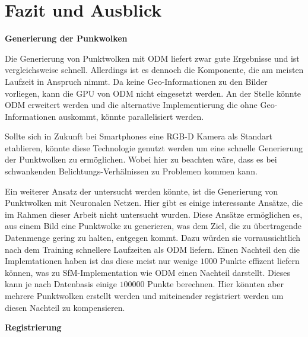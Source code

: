 \documentclass[12pt,titlepage, twoside]{article}
\begin{document}
\newpage
\section{Fazit und Ausblick}
\label{sec:fazit}
%

\textbf{Generierung der Punkwolken}

Die Generierung von Punktwolken mit ODM liefert zwar gute Ergebnisse und ist vergleichsweise schnell. Allerdings ist es dennoch die Komponente, die am meisten Laufzeit in Anspruch nimmt.
Da keine Geo-Informationen zu den Bilder vorliegen, kann die GPU von ODM nicht eingesetzt werden. 
An der Stelle könnte ODM erweitert werden und die alternative Implementierung die ohne Geo-Informationen auskommt, könnte parallelisiert werden.

Sollte sich in Zukunft bei Smartphones eine RGB-D Kamera als Standart etablieren, könnte diese Technologie genutzt werden um eine schnelle Generierung der Punktwolken zu ermöglichen.
Wobei hier zu beachten wäre, dass es bei schwankenden Belichtungs-Verhälnissen zu Problemen kommen kann. 

Ein weiterer Ansatz der untersucht werden könnte, ist die Generierung von Punktwolken mit Neuronalen Netzen. Hier gibt es einige interessante Ansätze, die im Rahmen dieser Arbeit nicht untersucht wurden. 
Diese Ansätze ermöglichen es, aus einem Bild eine Punktwolke zu generieren, was dem Ziel, die zu übertragende Datenmenge gering zu halten, entgegen kommt. 
Dazu würden sie vorraussichtlich nach dem Training schnellere Laufzeiten als ODM liefern.
Einen Nachteil den die Implemtationen haben ist das diese meist nur wenige $1000$ Punkte effizent liefern können, was zu SfM-Implementation wie ODM einen Nachteil darstellt. 
Dieses kann je nach Datenbasis einige $100000$ Punkte berechnen. Hier könnten aber mehrere Punktwolken erstellt werden und miteinender registriert werden um diesen Nachteil zu kompensieren.

\textbf{Registrierung}
\end{document}
